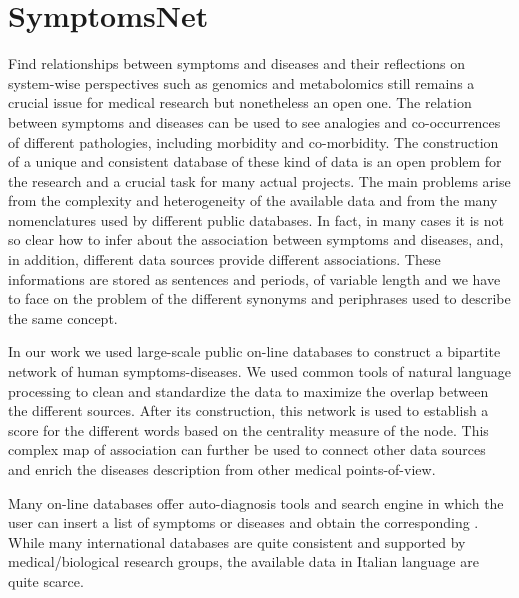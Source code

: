 \documentclass{standalone}
\begin{document}
\section[SymptomsNet]{SymptomsNet}\label{chimera:symptomsnet}

Find relationships between symptoms and diseases and their reflections on system-wise perspectives such as genomics and metabolomics still remains a crucial issue for medical research but nonetheless an open one.
The relation between symptoms and diseases can be used to see analogies and co-occurrences of different pathologies, including morbidity and co-morbidity.
The construction of a unique and consistent database of these kind of data is an open problem for the research and a crucial task for many actual projects.
The main problems arise from the complexity and heterogeneity of the available data and from the many nomenclatures used by different public databases.
In fact, in many cases it is not so clear how to infer about the association between symptoms and diseases, and, in addition, different data sources provide different associations.
These informations are stored as sentences and periods, of variable length and we have to face on the problem of the different synonyms and periphrases used to describe the same concept.

In our work we used large-scale public on-line databases to construct a bipartite network of human symptoms-diseases.
We used common tools of natural language processing to clean and standardize the data to maximize the overlap between the different sources.
After its construction, this network is used to establish a score for the different words based on the centrality measure of the node.
This complex map of association can further be used to connect other data sources and enrich the diseases description from other medical points-of-view.

Many on-line databases offer auto-diagnosis tools and search engine in which the user can insert a list of symptoms or diseases and obtain the corresponding .
While many international databases are quite consistent and supported by medical/biological research groups, the available data in Italian language are quite scarce.
\end{document}
